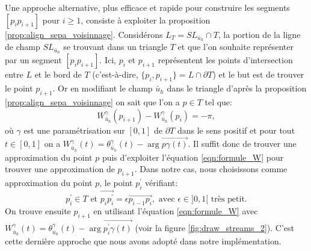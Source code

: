 Une approche alternative, plus efficace et rapide pour construire les segments $[p_ip_{i+1}]$ pour $i\geq 1$, consiste à exploiter la proposition \ref{prop:align_sepa_voisinnage}. Considérons $L_T=SL_{\bar{u}_h}\cap T$, la portion de la ligne de champ $SL_{\bar{u}_h}$ se trouvant dans un triangle $T$ et que l'on souhaite représenter par un segment $[p_ip_{i+1}]$. Ici, $p_i$ et $p_{i+1}$ représentent les points d'intersection entre $L$ et le bord de $T$ (c'est-à-dire, $\{p_i, p_{i+1}\}=L\cap\partial T$) et le but est de trouver le point $p_{i+1}$. Or en modifiant le champ $\bar{u}_h$ dans le triangle d'après la proposition \ref{prop:align_sepa_voisinnage} on sait que l'on a $p\in T$ tel que:
\begin{equation}
W^\gamma_{\bar{u}_h}(p_{i+1})-W^\gamma_{\bar{u}_h}(p_i)=-\pi,
\label{eqn:formule_W}
\end{equation}
où $\gamma$ est une paramétrisation sur $[0, 1]$ de $\partial T$ dans le sens positif et pour tout $t\in[0, 1]$ on a $W^\gamma_{\bar{u}_h}(t)=\theta_{\bar{u}_h}^\gamma(t)-\arg{\overrightarrow{p\gamma(t)}}$. Il suffit donc de trouver une approximation du point $p$ puis d'exploiter l'équation \ref{eqn:formule_W} pour trouver une approximation de $p_{i+1}$. Dans notre cas, nous choisissons comme approximation du point $p$, le point $p_i^{'}$ vérifiant:
$$
p_i^{'}\in T\mbox{ et }\overrightarrow{p_ip_i^{'}}=\epsilon\overrightarrow{p_{i-1}p_i}, \mbox{ avec }\epsilon\in]0, 1[ \mbox{ très petit}.
$$
On trouve ensuite $p_{i+1}$ en utilisant l'équation \ref{eqn:formule_W} avec $W^\gamma_{\bar{u}_h}(t)=\theta_{\bar{u}_h}^\gamma(t)-\arg{\overrightarrow{p_i^{'}\gamma(t)}}$ (voir la figure \ref{fig:draw_streams_2}). C'est cette dernière approche que nous avons adopté dans notre implémentation.

